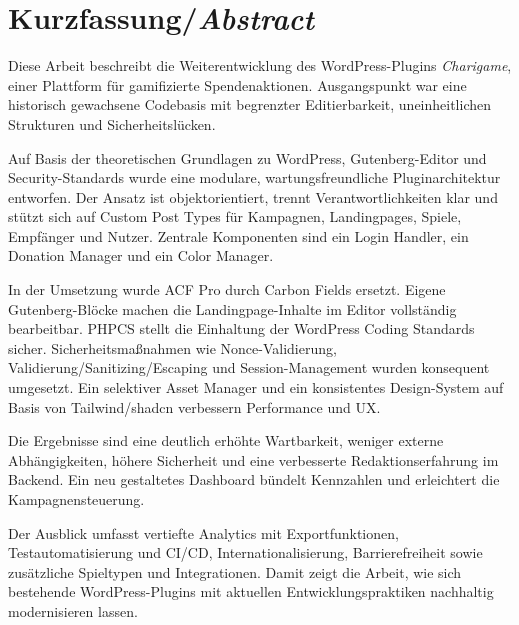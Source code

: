 
\chapter*{Kurzfassung/\emph{Abstract}}
\label{chap:abstract}
Diese Arbeit beschreibt die Weiterentwicklung des WordPress-Plugins \textit{Charigame}, einer Plattform für gamifizierte Spendenaktionen. Ausgangspunkt war eine historisch gewachsene Codebasis mit begrenzter Editierbarkeit, uneinheitlichen Strukturen und Sicherheitslücken.

Auf Basis der theoretischen Grundlagen zu WordPress, Gutenberg-Editor und Security-Standards wurde eine modulare, wartungsfreundliche Pluginarchitektur entworfen. Der Ansatz ist objektorientiert, trennt Verantwortlichkeiten klar und stützt sich auf Custom Post Types für Kampagnen, Landingpages, Spiele, Empfänger und Nutzer. Zentrale Komponenten sind ein Login Handler, ein Donation Manager und ein Color Manager.

In der Umsetzung wurde ACF Pro durch Carbon Fields ersetzt. Eigene Gutenberg-Blöcke machen die Landingpage-Inhalte im Editor vollständig bearbeitbar. PHPCS stellt die Einhaltung der WordPress Coding Standards sicher. Sicherheitsmaßnahmen wie Nonce-Validierung, Validierung/Sanitizing/Escaping und Session-Management wurden konsequent umgesetzt. Ein selektiver Asset Manager und ein konsistentes Design-System auf Basis von Tailwind/shadcn verbessern Performance und UX.

Die Ergebnisse sind eine deutlich erhöhte Wartbarkeit, weniger externe Abhängigkeiten, höhere Sicherheit und eine verbesserte Redaktionserfahrung im Backend. Ein neu gestaltetes Dashboard bündelt Kennzahlen und erleichtert die Kampagnensteuerung.

Der Ausblick umfasst vertiefte Analytics mit Exportfunktionen, Testautomatisierung und CI/CD, Internationalisierung, Barrierefreiheit sowie zusätzliche Spieltypen und Integrationen. Damit zeigt die Arbeit, wie sich bestehende WordPress-Plugins mit aktuellen Entwicklungspraktiken nachhaltig modernisieren lassen.



